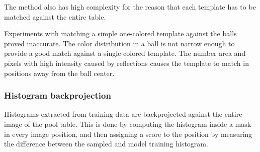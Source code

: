 The method also has high complexity for the reason that each template has to be matched against the entire table.

Experiments with matching a simple one-colored template against the balls proved inaccurate. The color distribution in a ball is not narrow enough to provide a good match against a single colored template. The number area and pixels with high intensity caused by reflections causes the template to match in positions away from the ball center.

\subsubsection{Histogram backprojection}
Histograms extracted from training data are backprojected against the entire image of the pool table. This is done by computing the histogram inside a mask in every image position, and then assigning a score to the position by measuring the difference between the sampled and model training histogram.

